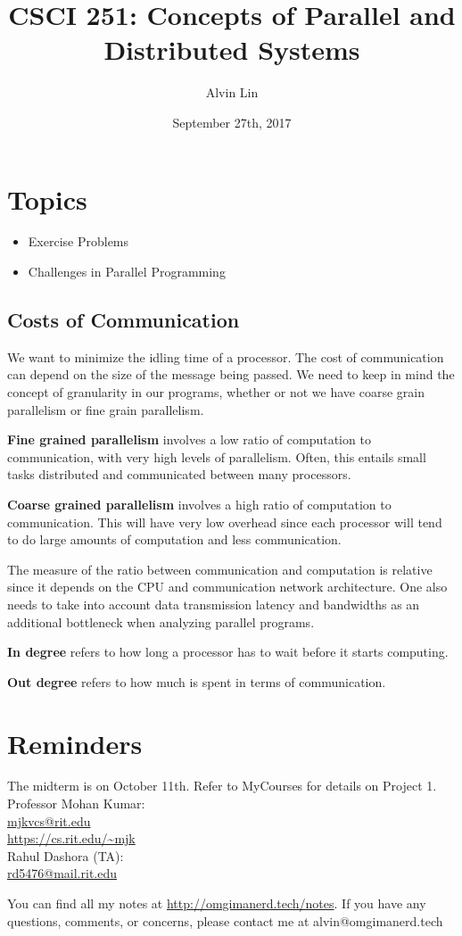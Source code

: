 \documentclass[letterpaper, 12pt]{math}
\title{CSCI 251: Concepts of Parallel and Distributed Systems}
\author{Alvin Lin}
\date{September 27th, 2017}
\begin{document}
\maketitle

\section*{Topics}
\begin{itemize}
  \item Exercise Problems
  \item Challenges in Parallel Programming
\end{itemize}

\subsection*{Costs of Communication}
We want to minimize the idling time of a processor. The cost of communication
can depend on the size of the message being passed. We need to keep in mind
the concept of granularity in our programs, whether or not we have coarse grain
parallelism or fine grain parallelism. \par
\textbf{Fine grained parallelism} involves a low ratio of computation to
communication, with very high levels of parallelism. Often, this entails small
tasks distributed and communicated between many processors. \par
\textbf{Coarse grained parallelism} involves a high ratio of computation to
communication. This will have very low overhead since each processor will tend
to do large amounts of computation and less communication. \par
The measure of the ratio between communication and computation is relative since
it depends on the CPU and communication network architecture. One also needs to
take into account data transmission latency and bandwidths as an additional
bottleneck when analyzing parallel programs. \par
\textbf{In degree} refers to how long a processor has to wait before it starts
computing. \par
\textbf{Out degree} refers to how much is spent in terms of communication.

\section*{Reminders}
The midterm is on October 11th.
Refer to MyCourses for details on Project 1. \\

\noindent Professor Mohan Kumar: \\
\url{mjkvcs@rit.edu} \\
\url{https://cs.rit.edu/~mjk} \\

\noindent Rahul Dashora (TA): \\
\url{rd5476@mail.rit.edu} \\

\begin{center}
  You can find all my notes at \url{http://omgimanerd.tech/notes}. If you have
  any questions, comments, or concerns, please contact me at
  alvin@omgimanerd.tech
\end{center}
\end{document}
